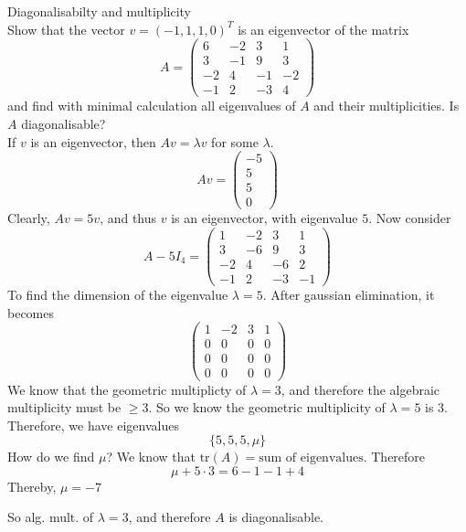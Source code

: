 \documentclass[journal, letterpaper]{IEEEtran}
\begin{document}
    \begin{myboxg}{Diagonalisabilty and multiplicity} \\ 
        Show that the vector $v = (-1, 1, 1, 0)^T$ is an eigenvector of the matrix
        $$ A = \begin{pmatrix}
            6 & -2 & 3 & 1 \\ 3 & -1 & 9 & 3 \\ -2 & 4 & -1 & -2 \\ -1 & 2 & -3 & 4
        \end{pmatrix}$$
        and find with minimal calculation all eigenvalues of $A$ and their multiplicities. Is $A$ diagonalisable?
        \newline \\ 
        If $v$ is an eigenvector, then $Av = \lambda v$ for some $\lambda$.
        $$ Av = \begin{pmatrix}
            -5 \\ 5 \\ 5 \\ 0
        \end{pmatrix}$$
        Clearly, $Av = 5v$, and thus $v$ is an eigenvector, with eigenvalue $5$. Now consider
        $$ A - 5I_4 = \begin{pmatrix}
            1 & -2 & 3 & 1 \\ 3 & -6 & 9 & 3 \\ -2 & 4 & -6 & 2 \\ -1 & 2 & -3 & -1
        \end{pmatrix}$$
        To find the dimension of the eigenvalue $\lambda = 5$. After gaussian elimination, it becomes
        $$ \begin{pmatrix}
            1 & -2 & 3 & 1  \\ 0 & 0 & 0 & 0 \\ 0 & 0 & 0 & 0 \\ 0 & 0 & 0 & 0
        \end{pmatrix}$$
        We know that the geometric multiplicty of $\lambda = 3$, and therefore the algebraic multiplicity must be $\ge 3$.
        So we know the geometric multiplicity of $\lambda = 5$ is 3. Therefore, we have eigenvalues
        $$ \{5, 5, 5, \mu \}$$
        How do we find $\mu$? We know that $\text{tr}(A) = \text{sum of eigenvalues}$. Therefore
        $$\mu + 5 \cdot 3 = 6 - 1 - 1 + 4$$
        Thereby, $\mu = -7$
        
        So alg. mult. of $\lambda = 3$, and therefore $A$ is diagonalisable.
    \end{myboxg}
\end{document}
